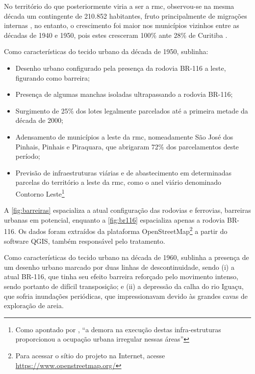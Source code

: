 	No território do que posteriormente viria a ser a \gls{rmc}, observou-se na mesma década um contingente de 210.852 habitantes, fruto principalmente de migrações internas \cite[p. 53]{castro2005a}, no entanto, o crescimento foi maior nos municípios vizinhos entre as décadas de 1940 e 1950, pois estes cresceram 100\% ante 28\% de Curitiba .
	
	Como características do tecido urbano da década de 1950,  sublinha:
	
	\begin{itemize}
		\item Desenho urbano configurado pela presença da rodovia BR-116 a leste, figurando como barreira;
		\item Presença de algumas manchas isoladas ultrapassando a rodovia BR-116;
		\item Surgimento de 25\% dos lotes legalmente parcelados até a primeira metade da década de 2000;
		\item Adensamento de municípios a leste da \gls{rmc}, nomeadamente São José dos Pinhais, Pinhais e Piraquara, que abrigaram 72\% dos parcelamentos deste período;
		\item Previsão de infraestruturas viárias e de abastecimento em determinadas parcelas do território a leste da \gls{rmc}, como o anel viário denominado Contorno Leste\footnote{Como apontado por , ``a demora na execução destas infra-estruturas proporcionou a ocupação urbana irregular nessas áreas''}
	\end{itemize}

	A \autoref{fig:barreiras} espacializa a atual configuração das rodovias e ferrovias, barreiras urbanas em potencial, enquanto a \autoref{fig:br116} espacializa apenas a rodovia BR-116. Os dados foram extraídos da plataforma OpenStreetMap\footnote{Para acessar o sítio do projeto na Internet, acesse \url{https://www.openstreetmap.org/}} a partir do software QGIS, também responsável pelo tratamento.
	
	Como características do tecido urbano na década de 1960,  sublinha a presença de um desenho urbano marcado por duas linhas de descontinuidade, sendo (i) a atual BR-116, que tinha seu efeito barreira reforçado pelo movimento intenso, sendo portanto de difícil transposição; e (ii) a depressão da calha do rio Iguaçu, que sofria inundações periódicas, que impressionavam devido às grandes cavas de exploração de areia.
	

